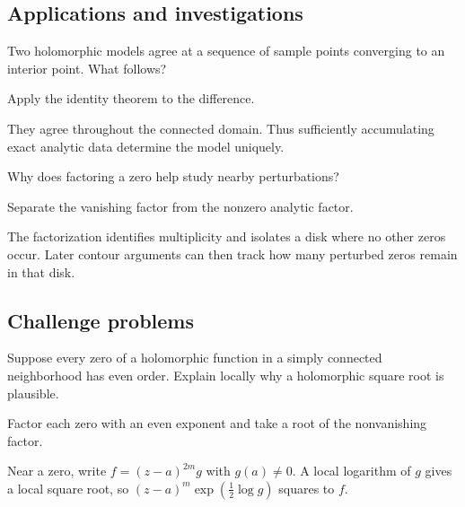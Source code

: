 \subsection*{Applications and investigations}

\begin{exercise}\label{exr:iv07-expand-13}
Two holomorphic models agree at a sequence of sample points converging to an interior point. What follows?
\end{exercise}
\begin{hint}
Apply the identity theorem to the difference.
\end{hint}
\begin{solution}
They agree throughout the connected domain. Thus sufficiently accumulating exact analytic data determine the model uniquely.
\end{solution}

\begin{exercise}\label{exr:iv07-expand-14}
Why does factoring a zero help study nearby perturbations?
\end{exercise}
\begin{hint}
Separate the vanishing factor from the nonzero analytic factor.
\end{hint}
\begin{solution}
The factorization identifies multiplicity and isolates a disk where no other zeros occur. Later contour arguments can then track how many perturbed zeros remain in that disk.
\end{solution}

\subsection*{Challenge problems}

\begin{exercise}\label{exr:iv07-expand-15}
Suppose every zero of a holomorphic function in a simply connected neighborhood has even order. Explain locally why a holomorphic square root is plausible.
\end{exercise}
\begin{hint}
Factor each zero with an even exponent and take a root of the nonvanishing factor.
\end{hint}
\begin{solution}
Near a zero, write \(f=(z-a)^{2m}g\) with \(g(a)\ne0\). A local logarithm of \(g\) gives a local square root, so \((z-a)^m\exp(\frac12\log g)\) squares to \(f\).
\end{solution}

